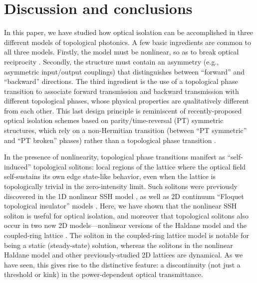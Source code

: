 \documentclass[aps,prx,twocolumn,superscriptaddress]{revtex4-1}
\begin{document}
\section{Discussion and conclusions}

In this paper, we have studied how optical isolation can be accomplished in three different models of topological photonics.  A few basic ingredients are common to all three models.  Firstly, the model must be nonlinear, so as to break optical reciprocity \cite{jalas2013}.  Secondly, the structure must contain an asymmetry (e.g., asymmetric input/output couplings) that distinguishes between ``forward'' and ``backward'' directions.  The third ingredient is the use of a topological phase transition to associate forward transmission and backward transmission with different topological phases, whose physical properties are qualitatively different from each other.  This last design principle is reminiscent of recently-proposed optical isolation schemes based on parity/time-reversal (PT) symmetric structures, which rely on a non-Hermitian transition (between ``PT symmetric'' and ``PT broken'' phases) rather than a topological phase transition \cite{peng2014nature,chang2014nature,zhou2016oe, Sergey2016lpr}.

In the presence of nonlinearity, topological phase transitions manifest as ``self-induced'' topological solitons: local regions of the lattice where the optical field self-sustains its own edge state-like behavior, even when the lattice is topologically trivial in the zero-intensity limit.  Such solitons were previously discovered in the 1D nonlinear SSH model \cite{alu2016}, as well as 2D continuum ``Floquet topological insulator'' models \cite{Lumer2013,daniel2016soliton}.  Here, we have shown that the nonlinear SSH soliton is useful for optical isolation, and moreover that topological solitons also occur in two new 2D models---nonlinear versions of the Haldane model \cite{haldane2008prl} and the coupled-ring lattice \cite{hafezi2011nphy,hafezi2014,liang2013,Pasek2014}.  The soliton in the coupled-ring lattice model is notable for being a static (steady-state) solution, whereas the solitons in the nonlinear Haldane model and other previously-studied 2D lattices \cite{Lumer2013,daniel2016soliton} are dynamical.  As we have seen, this gives rise to the distinctive feature: a discontinuity (not just a threshold or kink) in the power-dependent optical transmittance.
\end{document}
